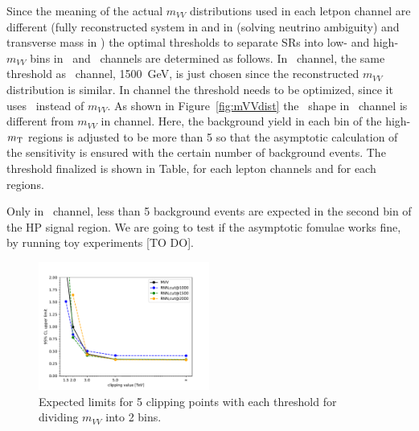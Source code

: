 Since the meaning of the actual $m_{VV}$ distributions used in each letpon channel are different
(fully reconstructed system in \tlep and in \olep (solving neutrino ambiguity) and transverse mass in \zlep)
the optimal thresholds to separate SRs into low- and high-$m_{VV}$ bins in \olep\ and \zlep\ channels 
are determined as follows.
In \olep\ channel, the same threshold as \tlep\ channel, 1500~GeV, is just chosen since the reconstructed $m_{VV}$ distribution is similar. 
In \zlep channel the threshold needs to be optimized, since it uses \mt\ instead of $m_{VV}$.
As shown in Figure~\ref{fig:mVVdist} the \mt\ shape in \zlep\ channel is different from $m_{VV}$ in \tlep channel.
Here, the background yield in each bin of the high-$m_{\mathrm{T}}$ regions is adjusted to be more than 5 so that
the asymptotic calculation of the sensitivity is ensured with the certain number of background events.
The threshold finalized is shown in Table, for each lepton channels and for each regions.

Only in \tlep\ channel,
less than 5 background events are expected in the second bin of the HP signal region.
We are going to test if the asymptotic fomulae works fine, by running toy experiments [TO DO].
%
\begin{figure}[h]
        \centering
    	\includegraphics[width=0.50\textwidth]{figures/aQGC/ClippedFT02bin.pdf}
        \caption{Expected limits for 5 clipping points with each threshold for dividing $m_{VV}$ into 2 bins.}
        \label{fig:ThresholdScan}
\end{figure}

